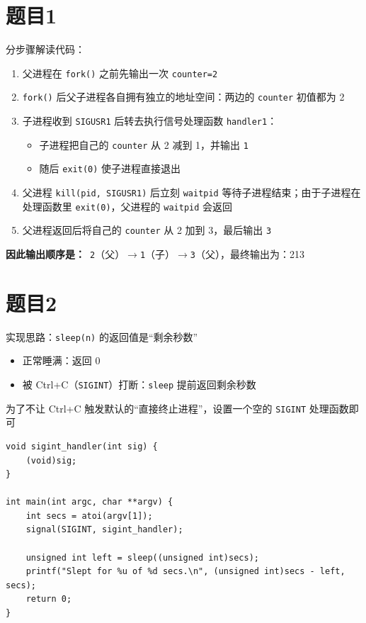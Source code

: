 \documentclass[fleqn]{ctexart}
\begin{document}
\section*{题目1}

分步骤解读代码：
\begin{enumerate}[label=(\arabic*)]
	\item 父进程在 \texttt{fork()} 之前先输出一次 \texttt{counter=2}
	\item \texttt{fork()} 后父子进程各自拥有独立的地址空间：两边的 \texttt{counter} 初值都为 2
	\item 子进程收到 \texttt{SIGUSR1} 后转去执行信号处理函数 \texttt{handler1}：
				\begin{itemize}
					\item 子进程把自己的 \texttt{counter} 从 2 减到 1，并输出 \texttt{1}
					\item 随后 \texttt{exit(0)} 使子进程直接退出
				\end{itemize}
	\item 父进程 \texttt{kill(pid, SIGUSR1)} 后立刻 \texttt{waitpid} 等待子进程结束；由于子进程在处理函数里 \texttt{exit(0)}，父进程的 \texttt{waitpid} 会返回
	\item 父进程返回后将自己的 \texttt{counter} 从 2 加到 3，最后输出 \texttt{3}
\end{enumerate}

\textbf{因此输出顺序是：}\ \texttt{2}（父）$\to$\texttt{1}（子）$\to$\texttt{3}（父），最终输出为：213

\section*{题目2}
实现思路：\texttt{sleep(n)} 的返回值是“剩余秒数”
\begin{itemize}
	\item 正常睡满：返回 0
	\item 被 Ctrl+C（\texttt{SIGINT}）打断：\texttt{sleep} 提前返回剩余秒数
\end{itemize}
为了不让 Ctrl+C 触发默认的“直接终止进程”，设置一个空的 \texttt{SIGINT} 处理函数即可

\begin{verbatim}
void sigint_handler(int sig) {
    (void)sig;
}

int main(int argc, char **argv) {
    int secs = atoi(argv[1]);
    signal(SIGINT, sigint_handler);

    unsigned int left = sleep((unsigned int)secs);
    printf("Slept for %u of %d secs.\n", (unsigned int)secs - left, secs);
    return 0;
}
\end{verbatim}
\end{document}
